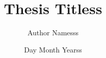 \documentclass[12pt]{article}
\title{Thesis Titless}
\author{Author Namesss}
\date{Day Month Yearss}
\begin{document}

% 
\clearpage

\clearpage


\clearpage

\tableofcontents
\clearpage

\let\LaTeXStandardClearpage\clearpage
\let\clearpage\relax  %
\listoffigures
\listofsuppfigures
\let\clearpage\LaTeXStandardClearpage %
\listoftables
\clearpage

\clearpage


\clearpage








\clearpage


\clearpage

\printbibliography
\end{document}
